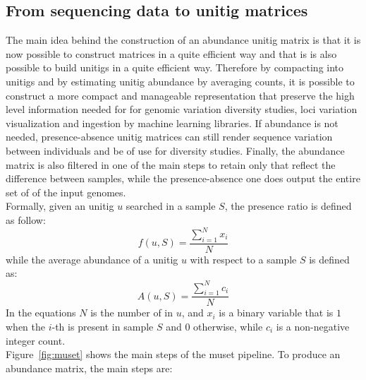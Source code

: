 \subsection{From sequencing data to unitig matrices}
The main idea behind the construction of an abundance unitig matrix is that it is now possible to construct \kmer matrices in a quite efficient way and that is is also possible to build unitigs in a quite efficient way. Therefore by compacting \kmers into unitigs and by estimating unitig abundance by averaging \kmer counts, it is possible to construct a more compact and manageable representation that preserve the high level information needed for for genomic variation diversity studies, loci variation visualization and ingestion by machine learning libraries. If abundance is not needed, presence-absence unitig matrices can still render sequence variation between individuals and be of use for diversity studies. Finally, the abundance matrix is also filtered in one of the main steps to retain only \kmers that reflect the difference between samples, while the presence-absence one does output the entire set of \kmers of the input genomes.\\
Formally, given an unitig $u$ searched in a sample $S$, the \kmer presence ratio is defined as follow:
\begin{equation}\label{Eq: Fraction of k-mers in unitig}
	f(u, S) = \frac{\sum_{i=1}^{N}{x_i}}{N}
\end{equation}
while the average abundance of a unitig $u$ with respect to a sample $S$ is defined as:
\begin{equation}\label{Eq: Average abundance of a unitig with respect to a sample}
	A(u, S) = \frac{\sum_{i=1}^{N}{c_i}}{N}
\end{equation}
In the equations $N$ is the number of \kmers in $u$, and $x_i$ is a binary variable that is $1$ when the $i$-th \kmer is present in sample $S$ and $0$ otherwise, while $c_i$ is a non-negative integer count.\\
Figure~\ref{fig:muset} shows the main steps of the muset pipeline. To produce an abundance matrix, the main steps are:
